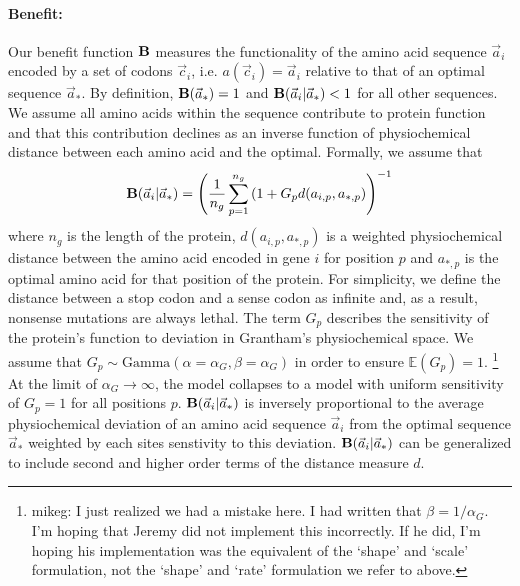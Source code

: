 \documentclass{article}
\newcommand{\EE}{\mathbb{E}} %
\newcommand{\Funcaoptvec}{\ensuremath{\Func(\aoptvec)}\xspace}
\newcommand{\Funcaveci}{\ensuremath{\Func(\aveci|\aoptvec)}\xspace}
\newcommand{\Func}{\ensuremath{\text{\textbf{B}}}\xspace}
\newcommand{\aip}{\ensuremath{a_{i,p}}\xspace}
\newcommand{\alphag}{\ensuremath{\alpha_G}\xspace}
\newcommand{\aoptp}{\ensuremath{a_{*,p}}\xspace}
\newcommand{\aoptvec}{\ensuremath{\Vec{a}_*}\xspace}
\newcommand{\aveci}{\ensuremath{\Vec{a}_i}\xspace}
\newcommand{\cveci}{\ensuremath{\cvec_i}\xspace}
\newcommand{\cvec}{\ensuremath{\Vec{c}}\xspace}
\renewcommand{\ng}{\ensuremath{{n_g}}\xspace}
\newcommand{\gp}{\ensuremath{{G_p}}\xspace}
\begin{document}
\paragraph*{Benefit: }
Our benefit function \Func measures the functionality of the amino acid sequence \aveci encoded by a set of codons \cveci, i.e. $a(\cveci) = \aveci$ relative to that of an optimal sequence $\aoptvec$.
By definition,  $\Funcaoptvec = 1$ and $\Funcaveci < 1$ for all other sequences.
We assume all amino acids within the sequence contribute to protein function and that this contribution declines as an inverse function of physiochemical distance between each amino acid and the optimal.
Formally, we assume that
\begin{equation}
\Funcaveci = \left(\frac{1}{\ng} \sum_{p=1}^\ng \left(1 + \gp d(\aip, \aoptp\right)\right)^{-1}
\end{equation}
where $\ng$ is the length of the protein, $d(\aip, \aoptp)$ is a weighted physiochemical distance between the amino acid encoded in gene $i$ for position $p$ and $\aoptp$ is the optimal amino acid for that position of the protein.
For simplicity, we define the distance between a stop codon and a sense codon as infinite and, as a result, nonsense mutations are always lethal.
The term \gp describes the sensitivity of the protein's function to deviation in Grantham's physiochemical space.
We assume that  $\gp \sim \text{Gamma}\left(\alpha = \alphag, \beta = \alphag\right)$ in order to ensure $\EE(\gp) = 1$.
\footnote{
mikeg: I just realized we had a mistake here.
I had written that $\beta = 1/\alphag$.
I'm hoping that Jeremy did not implement this incorrectly.
If he did, I'm hoping his implementation was the equivalent of the `shape' and `scale' formulation, not the `shape' and `rate' formulation we refer to above.}
At the limit of $\alphag \rightarrow \infty$, the model collapses to a model with uniform sensitivity of $\gp = 1$ for all positions $p$.
\Funcaveci is inversely proportional to the average physiochemical deviation of an amino acid sequence \aveci from the optimal sequence \aoptvec weighted by each sites senstivity to this deviation.
\Funcaveci can be generalized to include second and higher order terms of the distance measure $d$.
\end{document}
